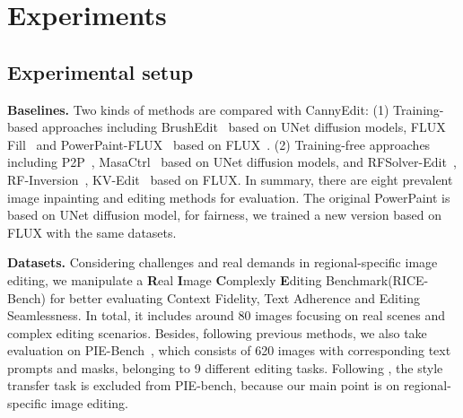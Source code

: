 \documentclass{article}
\begin{document}








\section{Experiments}
\label{Sec:experiment}


\subsection{Experimental setup}

\textbf{Baselines.} Two kinds of methods are compared with CannyEdit: (1) Training-based approaches including BrushEdit~\cite{li2024brushedit} based on UNet diffusion models, FLUX Fill~\cite{blackforest2024FLUX} and PowerPaint-FLUX~\cite{zhuang2023task} based on FLUX~\cite{blackforest2024FLUX}. (2) Training-free approaches including P2P~\cite{hertz2022prompt}, MasaCtrl~\cite{cao2023masactrl} based on UNet diffusion models, and RFSolver-Edit~\cite{wang2024taming}, RF-Inversion~\cite{rout2024semantic}, KV-Edit~\cite{zhu2025kv} based on FLUX. In summary, there are eight prevalent image inpainting and editing methods for evaluation. The original PowerPaint is based on UNet diffusion model, for fairness, we trained a new version based on FLUX with the same datasets.


\textbf{Datasets.} Considering challenges and real demands in regional-specific image editing, we manipulate a \textbf{R}eal \textbf{I}mage \textbf{C}omplexly \textbf{E}diting Benchmark(RICE-Bench) for better evaluating Context Fidelity, Text Adherence and Editing Seamlessness. In total, it includes around 80 images focusing on real scenes and complex editing scenarios. Besides, following previous methods, we also take evaluation on PIE-Bench~\cite{ju2024pnp}, which consists of 620 images with corresponding text prompts and masks, belonging to 9 different editing tasks. Following \cite{li2024brushedit, xu2023infedit, zhu2025kv}, the style transfer task is excluded from PIE-bench, because our main point is on regional-specific image editing.
\end{document}
